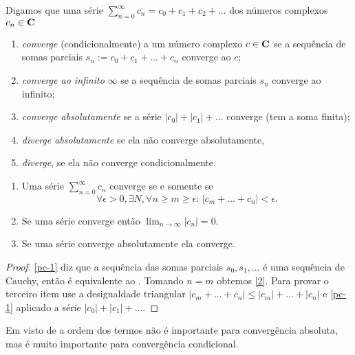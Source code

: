 \begin{defin}
Digamos que uma série $\sum_{n=0}^\infty c_n = c_0 + c_1 + c_2 + \dots$ dos números complexos $c_n\in\mathbf{C}$
\begin{enumerate}
\item \emph{converge} (condicionalmente) a um número complexo $c\in \mathbf{C}$ se a sequência de somas parciais
$s_n := c_0 + c_1 + \dots + c_n$ converge ao $c$;
\item \emph{converge ao infinito} $\infty$ se a sequência de somas parciais $s_n$
converge ao infinito;
\item \emph{converge absolutamente} se a série $|c_0| + |c_1| + \dots$ converge (tem a soma finita);
\item \emph{diverge absolutamente} se ela não converge absolutamente,
\item \emph{diverge}, se ela não converge condicionalmente.
\end{enumerate}
\end{defin}

\begin{prop}
\label{p:convergencia}
\begin{enumerate}
\item \label{pc-1} Uma série $\sum_{n=0}^\infty c_n$ converge se e somente se
\[ \forall \epsilon>0, \exists N, \forall n\geq m\geq \epsilon:\, |c_m + \dots + c_n| < \epsilon .\]
\item \label{pc-2} Se uma série converge então $\lim_{n\to\infty} |c_n| = 0$.
\item \label{pc-3} Se uma série converge absolutamente ela converge.
\end{enumerate}
\end{prop}
\begin{proof}
\eqref{pc-1} diz que a sequência das somas parciais $s_0,s_1,\dots$ é uma sequência de Cauchy,
então é equivalente ao . Tomando $n=m$ obtemos \eqref{2}.
Para provar o terceiro item use a desigualdade triangular
$|c_m + \dots + c_n| \leq |c_m| + \dots + |c_n|$
e \eqref{pc-1} aplicado a série $|c_0| + |c_1| + \dots$.
\end{proof}

Em visto de 
a ordem dos termos não é importante para convergência absoluta,
mas é muito importante para convergência condicional.

